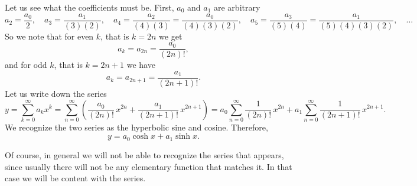 \documentclass[12pt]{book}
\begin{document}
\begin{example}
Let us see what the coefficients
must be.  First, $a_0$ and $a_1$ are arbitrary
\begin{equation*}
a_2 = \frac{a_0}{2}, \quad
a_3 = \frac{a_1}{(3)(2)}, \quad
a_4 = \frac{a_2}{(4)(3)} = \frac{a_0}{(4)(3)(2)}, \quad
a_5 = \frac{a_3}{(5)(4)} = \frac{a_1}{(5)(4)(3)(2)}, \quad \ldots
\end{equation*}
So we note that for even $k$, that is $k=2n$
we get
\begin{equation*}
a_k = a_{2n} = \frac{a_0}{(2n)!} ,
\end{equation*}
and for odd $k$, that is $k=2n+1$ we have
\begin{equation*}
a_k = a_{2n+1} = \frac{a_1}{(2n+1)!} .
\end{equation*}
Let us write down the series
\begin{equation*}
y =
\sum_{k=0}^\infty
a_k x^k
=
\sum_{n=0}^\infty
\left(
\frac{a_0}{(2n)!} \,x^{2n}
+
\frac{a_1}{(2n+1)!} \,x^{2n+1}
\right)
=
a_0
\sum_{n=0}^\infty
\frac{1}{(2n)!} \,x^{2n}
+
a_1
\sum_{n=0}^\infty
\frac{1}{(2n+1)!} \,x^{2n+1} .
\end{equation*}
We recognize the two series as the hyperbolic sine and cosine.
Therefore,
\begin{equation*}
y =
a_0 \cosh x + a_1 \sinh x .
\end{equation*}
\end{example}

Of course, in general we will not be able to recognize 
the series that appears, since usually there will not be
any elementary function that matches it.  In that case we will be
content with the series.
\end{document}
